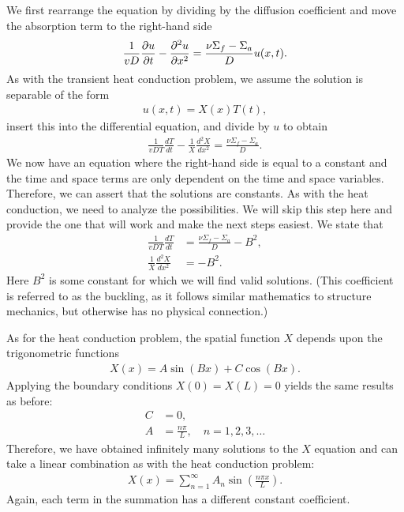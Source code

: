 We first rearrange the equation by dividing by the diffusion coefficient and move the absorption term to the right-hand side
\begin{align}
  \frac{1}{v D} \frac{ \partial {u} }{ \partial {t} } - \frac{ \partial^2 {u} }{ \partial {x}^2 } = \frac{ \nu \Sigma_f - \Sigma_a }{ D } u(x,t) .
\end{align}
As with the transient heat conduction problem, we assume the solution is separable of the form
\begin{align}
  u(x,t) = X(x) T(t) ,
\end{align}
insert this into the differential equation, and divide by $u$ to obtain
\begin{align}
  \frac{1}{v D T} \frac{dT}{dt} - \frac{1}{X} \frac{d^2 X}{dx^2} = \frac{ \nu \Sigma_f - \Sigma_a }{ D } .
\end{align}
We now have an equation where the right-hand side is equal to a constant and the time and space terms are only dependent on the time and space variables. Therefore, we can assert that the solutions are constants. As with the heat conduction, we need to analyze the possibilities. We will skip this step here and provide the one that will work and make the next steps easiest. We state that
\begin{subequations}
\begin{align}
  \frac{1}{vD T} \frac{dT}{dt} &= \frac{ \nu \Sigma_f - \Sigma_a }{ D } - B^2, \\
  \frac{1}{X} \frac{d^2 X}{dx^2} &= -B^2 .
\end{align}
\end{subequations}
Here $B^2$ is some constant for which we will find valid solutions. (This coefficient is referred to as the buckling, as it follows similar mathematics to structure mechanics, but otherwise has no physical connection.) 

As for the heat conduction problem, the spatial function $X$ depends upon the trigonometric functions
\begin{align}
  X(x) = A \sin ( Bx ) + C \cos ( Bx ) .
\end{align}
Applying the boundary conditions $X(0) = X(L) = 0$ yields the same results as before:
\begin{subequations}
\begin{align}
  C &= 0, \\
  A &= \frac{n\pi}{L}, \quad n = 1, 2, 3, \ldots
\end{align}
\end{subequations}
Therefore, we have obtained infinitely many solutions to the $X$ equation and can take a linear combination as with the heat conduction problem:
\begin{align}
  X(x) = \sum_{n=1}^\infty A_n \sin \left( \frac{ n \pi x }{ L } \right) .
\end{align}
Again, each term in the summation has a different constant coefficient.

